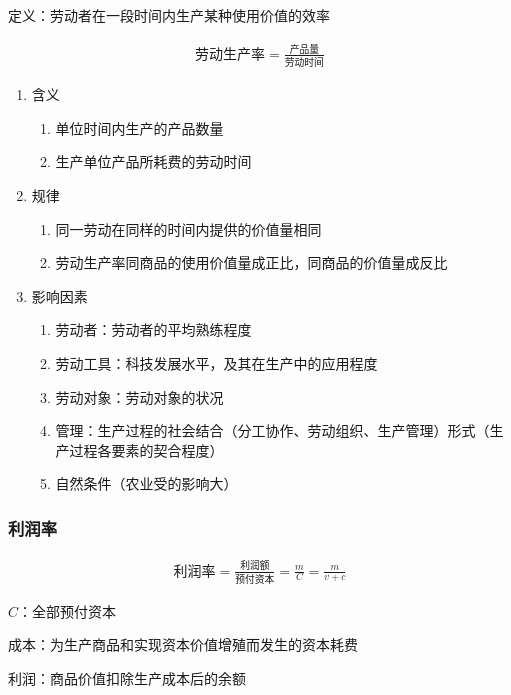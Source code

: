 \documentclass[12pt]{book}
\begin{document}
定义：劳动者在一段时间内生产某种使用价值的效率

\begin{gather*}
    \text{劳动生产率}=\frac{\text{产品量}}{\text{劳动时间}}
\end{gather*}

\begin{enumerate}[1.]
    \item 含义
    \begin{enumerate}[(1)]
        \item 单位时间内生产的产品数量
        \item 生产单位产品所耗费的劳动时间
    \end{enumerate}
    \item 规律
    \begin{enumerate}[(1)]
        \item 同一劳动在同样的时间内提供的价值量相同
        \item 劳动生产率同商品的使用价值量成正比，同商品的价值量成反比
    \end{enumerate}
    \item 影响因素
    \begin{enumerate}[(1)]
        \item 劳动者：劳动者的平均熟练程度
        \item 劳动工具：科技发展水平，及其在生产中的应用程度
        \item 劳动对象：劳动对象的状况
        \item 管理：生产过程的社会结合（分工协作、劳动组织、生产管理）形式（生产过程各要素的契合程度）
        \item 自然条件（农业受的影响大）
    \end{enumerate}
\end{enumerate}
    





\subsubsection{利润率}


\begin{gather*}
    \text{利润率}=\frac{\text{利润额}}{\text{预付资本}}
=\frac{m}{C}
=\frac{m}{v+c}
\end{gather*}

\par $C$：全部预付资本  
\par 成本：为生产商品和实现资本价值增殖而发生的资本耗费
\par 利润：商品价值扣除生产成本后的余额
\end{document}
